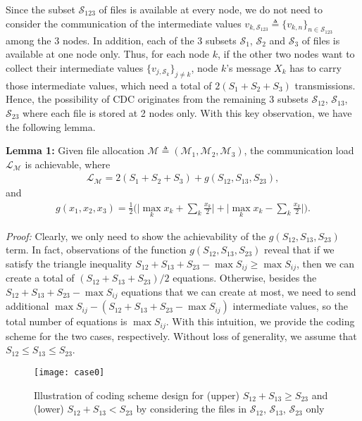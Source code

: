\documentclass[conference]{IEEEtran}
\begin{document}
Since the subset $\mathcal{S}_{123}$ of files is available at every node, we do not need to consider the communication of the intermediate values $v_{k,\mathcal{S}_{123}}\triangleq \{v_{k,n}\}_{n\in\mathcal{S}_{123}}$ among the 3 nodes. In addition, each of the 3 subsets $\mathcal{S}_1$, $\mathcal{S}_2$ and $\mathcal{S}_3$ of files is available at one node only. Thus, for each node $k$, if the other two nodes want to collect their intermediate values $\{v_{j,\mathcal{S}_k}\}_{j\neq k}$, node $k$'s message $X_k$ has to carry those intermediate values, which need a total of $2(S_1+S_2+S_3)$ transmissions. Hence, the possibility of CDC originates from the remaining 3 subsets $\mathcal{S}_{12}$, $\mathcal{S}_{13}$, $\mathcal{S}_{23}$ where each file is stored at 2 nodes only. With this key observation, we have the following lemma.

{\bf Lemma 1:} Given file allocation $\mathcal{M}\triangleq (\mathcal{M}_1,\mathcal{M}_2,\mathcal{M}_3)$, the communication load ${\mathcal L}_{\mathcal{M}}$ is achievable, where
\begin{eqnarray}
\mathcal{L}_{\mathcal{M}}=2(S_1+S_2+S_3)+g(S_{12},S_{13},S_{23}),\label{eqn:T}
\end{eqnarray}
and
\begin{eqnarray*}
g(x_1,x_2,x_3)=\frac{1}{2}\Big(\Big|\max_k x_k\!+\!\sum_k \frac{x_k}{2}\Big|\!+\!\Big|\max_k x_k\!-\!\sum_k \frac{x_k}{2}\Big|\Big).
\end{eqnarray*}

{\it Proof:} Clearly, we only need to show the achievability of the $g(S_{12},S_{13},S_{23})$ term. In fact, observations of the function $g(S_{12},S_{13},S_{23})$ reveal that if we satisfy the triangle inequality $S_{12}+S_{13}+S_{23}-\max S_{ij}\geq \max S_{ij}$, then we can create a total of $(S_{12}\!+\!S_{13}\!+\!S_{23})/2$ equations. Otherwise, besides the $S_{12}\!+\!S_{13}\!+\!S_{23}\!-\!\max S_{ij}$ equations that we can create at most, we need to send additional $\max S_{ij}\!-(\!S_{12}\!+\!S_{13}\!+\!S_{23}\!-\max S_{ij}\!)$ intermediate values, so the total number of equations is $\max S_{ij}$.
With this intuition, we provide the coding scheme for the two cases, respectively. Without loss of generality, we assume that $S_{12}\leq S_{13}\leq S_{23}$.

\begin{figure}[!b] \centering%
\texttt{[image: case0]}%
\caption{Illustration of coding scheme design for (upper) $S_{12}+ S_{13}\geq S_{23}$ and (lower) $S_{12}+ S_{13}< S_{23}$ by considering the files in $\mathcal{S}_{12}$, $\mathcal{S}_{13}$, $\mathcal{S}_{23}$ only}\label{fig:case0}%
\end{figure}
\end{document}
